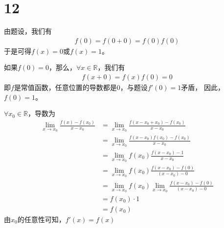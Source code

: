 \documentclass{article}
\begin{document}
\section*{12}

由题设，我们有
\begin{align*}
  f(0) = f(0 + 0) = f(0) f(0)
\end{align*}
于是可得$f(x) = 0$或$f(x) = 1$。

如果$f(0) = 0$，那么，$\forall x \in \mathbb{R}$，我们有
\begin{align*}
  f(x + 0) = f(x) f(0) = 0
\end{align*}
即$f$是常值函数，任意位置的导数都是0，与题设$f'(0) = 1$矛盾，
因此，$f(0) = 1$。

$\forall x_0 \in \mathbb{R}$，导数为
\begin{align*}
  \lim\limits_{x \to x_0} \frac{f(x) - f(x_0)}{x - x_0}
  & = \lim\limits_{x \to x_0} \frac{f(x - x_0 + x_0) - f(x_0)}{x - x_0}                              \\
  & = \lim\limits_{x \to x_0} \frac{f(x - x_0)f(x_0) - f(x_0)}{x - x_0}                              \\
  & = \lim\limits_{x \to x_0} f(x_0) \frac{f(x - x_0) - 1}{x - x_0}                                  \\
  & = \lim\limits_{x \to x_0} f(x_0) \frac{f(x - x_0) - f(0)}{(x - x_0) - 0}                         \\
  & = \lim\limits_{x \to x_0} f(x_0) \lim\limits_{x \to x_0} \frac{f(x - x_0) - f(0)}{(x - x_0) - 0} \\
  & = f(x_0) \cdot 1 \\
  & = f(x_0)
\end{align*}
由$x_0$的任意性可知，$f'(x) = f(x)$
\end{document}
